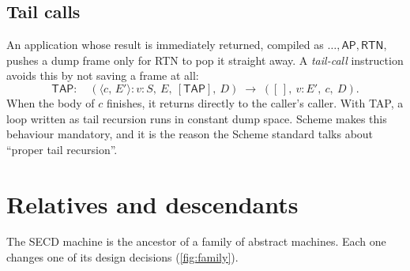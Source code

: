 \documentclass[11pt,a4paper]{article}
\newcommand{\cl}[2]{\langle #1,\, #2\rangle}
\newcommand{\emp}{[\,]}
\newcommand{\ins}[1]{\textsf{#1}}
\newcommand{\st}[4]{(#1,\ #2,\ #3,\ #4)}
\theoremstyle{definition}
\theoremstyle{plain}
\begin{document}
\subsection{Tail calls}\label{sec:tailcalls}

An application whose result is immediately returned, compiled as
$\dots, \ins{AP}, \ins{RTN}$, pushes a dump frame only for \ins{RTN} to pop it
straight away. A \emph{tail-call} instruction avoids this by not saving a frame at all:
\[
  \ins{TAP}:\quad \st{\cl{c}{E'} : v : S}{E}{[\ins{TAP}]}{D} \;\to\; \st{\emp}{v : E'}{c}{D}.
\]
When the body of $c$ finishes, it returns directly to the caller's caller.
With \ins{TAP}, a loop written as tail recursion runs in constant dump
space. Scheme makes this behaviour mandatory, and it is the reason the
Scheme standard talks about ``proper tail recursion''.

\section{Relatives and descendants}\label{sec:relatives}

The SECD machine is the ancestor of a family of abstract machines. Each one
changes one of its design decisions (\cref{fig:family}).
\end{document}
